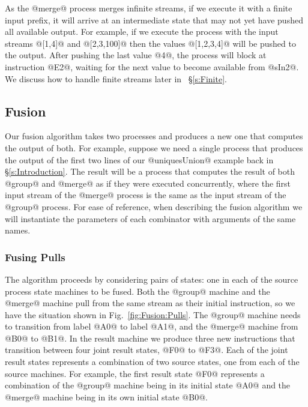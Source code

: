 As the @merge@ process merges infinite streams, if we execute it with a finite input prefix, it will arrive at an intermediate state that may not yet have pushed all available output. For example, if we execute the process with the input streams @[1,4]@ and @[2,3,100]@ then the values @[1,2,3,4]@ will be pushed to the output. After pushing the last value @4@, the process will block at instruction @E2@, waiting for the next value to become available from @sIn2@. We discuss how to handle finite streams later in ~\S\ref{s:Finite}.


\subsection{Fusion}

Our fusion algorithm takes two processes and produces a new one that computes the output of both. For example, suppose we need a single process that produces the output of the first two lines of our @uniquesUnion@ example back in \S\ref{s:Introduction}. The result will be a process that computes the result of both @group@ and @merge@ as if they were executed concurrently, where the first input stream of the @merge@ process is the same as the input stream of the @group@ process. For ease of reference, when describing the fusion algorithm we will instantiate the parameters of each combinator with arguments of the same names.


\subsubsection{Fusing Pulls}
\label{s:Fusion:FusingPulls}

The algorithm proceeds by considering pairs of states: one in each of the source process state machines to be fused. Both the @group@ machine and the @merge@ machine pull from the same stream as their initial instruction, so we have the situation shown in Fig.~\ref{fig:Fusion:Pulls}. The @group@ machine needs to transition from label @A0@ to label @A1@, and the @merge@ machine from @B0@ to @B1@. In the result machine we produce three new instructions that transition between four joint result states, @F0@ to @F3@.
Each of the joint result states represents a combination of two source states, one from each of the source machines. For example, the first result state @F0@ represents a combination of the @group@ machine being in its initial state @A0@ and the @merge@ machine being in its own initial state @B0@. 

